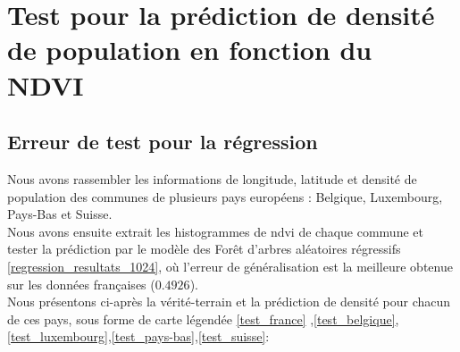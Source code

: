 \documentclass{book}
\begin{document}
\chapter{Test pour la prédiction de densité de population en fonction du NDVI}

\section{Erreur de test pour la régression}

Nous avons rassembler les informations de longitude, latitude et densité de population des communes de plusieurs pays européens : Belgique, 
Luxembourg, Pays-Bas et Suisse.\\
Nous avons ensuite extrait les histogrammes de ndvi de chaque commune et tester la prédiction par le modèle des For\^{e}t d'arbres aléatoires régressifs
\ref{regression_resultats_1024}, où l'erreur de généralisation est la meilleure obtenue sur les données françaises ($0.4926$).\\

Nous présentons ci-après la vérité-terrain et la prédiction de densité pour chacun de ces pays, sous forme de carte légendée \ref{test_france}
,\ref{test_belgique},\ref{test_luxembourg},\ref{test_pays-bas},\ref{test_suisse}:\\
\end{document}
